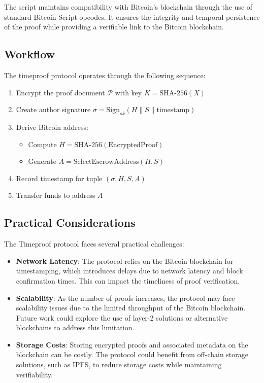 \documentclass[12pt]{report}
\begin{document}
The script maintains compatibility with Bitcoin's blockchain through the use of standard Bitcoin Script opcodes. It ensures the integrity and temporal persistence of the proof while providing a verifiable link to the Bitcoin blockchain.

\subsection{Workflow}

The timeproof protocol operates through the following sequence:

\begin{enumerate}
    \item Encrypt the proof document \( \mathcal{P} \) with key \( K = \text{SHA-256}(X) \)
    \item Create author signature $\sigma = \text{Sign}_{sk}(H \parallel S \parallel \text{timestamp})$
    \item Derive Bitcoin address:
    \begin{itemize}
        \item Compute \( H = \text{SHA-256}(\text{EncryptedProof}) \)
        \item Generate \( A = \text{SelectEscrowAddress}(H, S) \)
    \end{itemize}
    \item Record timestamp for tuple $(\sigma, H, S, A)$
    \item Transfer funds to address \( A \)
\end{enumerate}

\subsection{Practical Considerations}

The Timeproof protocol faces several practical challenges:
\begin{itemize}
    \item \textbf{Network Latency}: The protocol relies on the Bitcoin blockchain for timestamping, which introduces delays due to network latency and block confirmation times. This can impact the timeliness of proof verification.
    \item \textbf{Scalability}: As the number of proofs increases, the protocol may face scalability issues due to the limited throughput of the Bitcoin blockchain. Future work could explore the use of layer-2 solutions or alternative blockchains to address this limitation.
    \item \textbf{Storage Costs}: Storing encrypted proofs and associated metadata on the blockchain can be costly. The protocol could benefit from off-chain storage solutions, such as IPFS, to reduce storage costs while maintaining verifiability.
\end{itemize}
\end{document}
